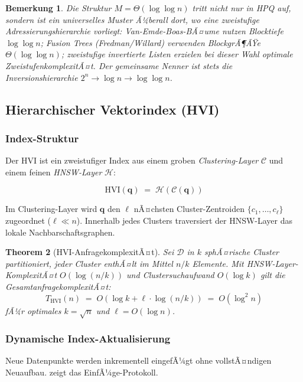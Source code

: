﻿\documentclass[12pt,a4paper]{article}
\newtheorem{theorem}{Theorem}[section]
\newtheorem{remark}[theorem]{Bemerkung}
\begin{document}
\begin{remark}
  Die Struktur $M = \Theta(\log\log n)$ tritt nicht nur in HPQ auf, 
  sondern ist ein universelles Muster Ã¼berall dort, wo eine zweistufige 
  Adressierungshierarchie vorliegt: Van-Emde-Boas-BÃ¤ume nutzen 
  Blocktiefe $\log\log n$; Fusion Trees (Fredman/Willard) verwenden 
  BlockgrÃ¶ÃŸe $\Theta(\log\log n)$; zweistufige invertierte Listen 
  erzielen bei dieser Wahl optimale ZweistufenkomplexitÃ¤t. 
  Der gemeinsame Nenner ist stets die Inversionshierarchie 
  $2^n \to \log n \to \log\log n$.
\end{remark}

\subsection{Hierarchischer Vektorindex (HVI)}
\label{sec:hvi}

\subsubsection{Index-Struktur}

Der HVI ist ein zweistufiger Index aus einem groben 
\emph{Clustering-Layer} $\mathcal{C}$ und einem feinen 
\emph{HNSW-Layer} $\mathcal{H}$:

\[
  \text{HVI}(\mathbf{q}) \;=\; \mathcal{H}\!\left(
    \mathcal{C}(\mathbf{q})
  \right)
\]

Im Clustering-Layer wird $\mathbf{q}$ den $\ell$ nÃ¤chsten 
Cluster-Zentroiden $\{c_1,\ldots,c_\ell\}$ zugeordnet ($\ell \ll n$). 
Innerhalb jedes Clusters traversiert der HNSW-Layer das lokale 
Nachbarschaftsgraphen.

\begin{theorem}[HVI-AnfragekomplexitÃ¤t]
\label{thm:complexity}
Sei $\mathcal{D}$ in $k$ sphÃ¤rische Cluster partitioniert, 
jeder Cluster enthÃ¤lt im Mittel $n/k$ Elemente. Mit HNSW-Layer-KomplexitÃ¤t 
$O(\log(n/k))$ und Clustersuchaufwand $O(\log k)$ gilt die 
GesamtanfragekomplexitÃ¤t:
\[
  T_{\text{HVI}}(n) \;=\; O\!\left(\log k + \ell \cdot \log(n/k)\right)
  \;=\; O\!\left(\log^2 n\right)
\]
fÃ¼r optimales $k = \sqrt{n}$ und $\ell = O(\log n)$.
\end{theorem}

\subsubsection{Dynamische Index-Aktualisierung}

Neue Datenpunkte werden inkrementell eingefÃ¼gt ohne vollstÃ¤ndigen 
Neuaufbau.  zeigt das EinfÃ¼ge-Protokoll.
\end{document}
